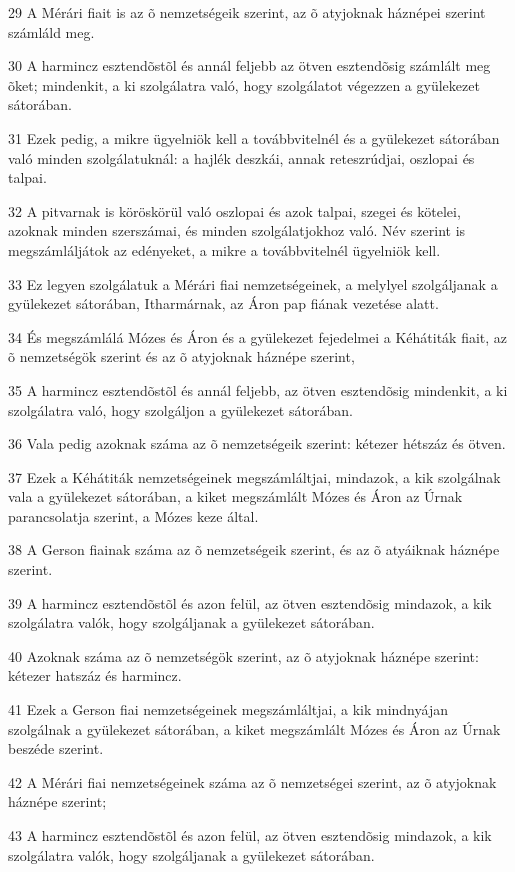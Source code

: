 \par 29 A Mérári fiait is az õ nemzetségeik szerint, az õ atyjoknak háznépei szerint számláld meg.
\par 30 A harmincz esztendõstõl és annál feljebb az ötven esztendõsig számlált meg õket; mindenkit, a ki szolgálatra való, hogy szolgálatot végezzen a gyülekezet sátorában.
\par 31 Ezek pedig, a mikre ügyelniök kell a továbbvitelnél és a gyülekezet sátorában való minden szolgálatuknál: a hajlék deszkái, annak reteszrúdjai, oszlopai és talpai.
\par 32 A pitvarnak is köröskörül való oszlopai és azok talpai, szegei és kötelei, azoknak minden szerszámai, és minden szolgálatjokhoz való. Név szerint is megszámláljátok az edényeket, a mikre a továbbvitelnél ügyelniök kell.
\par 33 Ez legyen szolgálatuk a Mérári fiai nemzetségeinek, a melylyel szolgáljanak a gyülekezet sátorában, Itharmárnak, az Áron pap fiának vezetése alatt.
\par 34 És megszámlálá Mózes és Áron és a gyülekezet fejedelmei a Kéhátiták fiait, az õ nemzetségök szerint és az õ atyjoknak háznépe szerint,
\par 35 A harmincz esztendõstõl és annál feljebb, az ötven esztendõsig mindenkit, a ki szolgálatra való, hogy szolgáljon a gyülekezet sátorában.
\par 36 Vala pedig azoknak száma az õ nemzetségeik szerint: kétezer hétszáz és ötven.
\par 37 Ezek a Kéhátiták nemzetségeinek megszámláltjai, mindazok, a kik szolgálnak vala a gyülekezet sátorában, a kiket megszámlált Mózes és Áron az Úrnak parancsolatja szerint, a Mózes keze által.
\par 38 A Gerson fiainak száma az õ nemzetségeik szerint, és az õ atyáiknak háznépe szerint.
\par 39 A harmincz esztendõstõl és azon felül, az ötven esztendõsig mindazok, a kik szolgálatra valók, hogy szolgáljanak a gyülekezet sátorában.
\par 40 Azoknak száma az õ nemzetségök szerint, az õ atyjoknak háznépe szerint: kétezer hatszáz és harmincz.
\par 41 Ezek a Gerson fiai nemzetségeinek megszámláltjai, a kik mindnyájan szolgálnak a gyülekezet sátorában, a kiket megszámlált Mózes és Áron az Úrnak beszéde szerint.
\par 42 A Mérári fiai nemzetségeinek száma az õ nemzetségei szerint, az õ atyjoknak háznépe szerint;
\par 43 A harmincz esztendõstõl és azon felül, az ötven esztendõsig mindazok, a kik szolgálatra valók, hogy szolgáljanak a gyülekezet sátorában.
